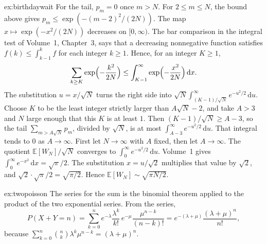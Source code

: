 \begin{solution}{ex:birthdaywait}
For the tail, $p_m=0$ once $m>N$. For $2\le m\le N$, the bound above gives $p_m\le\exp(-(m-2)^2/(2N))$. The map $x\mapsto\exp(-x^2/(2N))$ decreases on $[0,\infty)$. The bar comparison in the integral test of Volume~1, Chapter~3, says that a decreasing nonnegative function satisfies $f(k)\le\int_{k-1}^k f$ for each integer $k\ge1$. Hence, for an integer $K\ge1$,
\[
 \sum_{k\ge K}\exp\Bigl(-\frac{k^2}{2N}\Bigr)
 \le\int_{K-1}^\infty\exp\Bigl(-\frac{x^2}{2N}\Bigr)\,\mathrm dx.
\]
The substitution $u=x/\sqrt N$ turns the right side into $\sqrt N\int_{(K-1)/\sqrt N}^\infty e^{-u^2/2}\,\mathrm du$. Choose $K$ to be the least integer strictly larger than $A\sqrt N-2$, and take $A>3$ and $N$ large enough that this $K$ is at least $1$. Then $(K-1)/\sqrt N\ge A-3$, so the tail $\sum_{m>A\sqrt N}p_m$, divided by $\sqrt N$, is at most $\int_{A-3}^\infty e^{-u^2/2}\,\mathrm du$. That integral tends to $0$ as $A\to\infty$. First let $N\to\infty$ with $A$ fixed, then let $A\to\infty$. The quotient $\mathbb E[W_N]/\sqrt N$ converges to $\int_0^\infty e^{-u^2/2}\,\mathrm du$. Volume~1 gives $\int_0^\infty e^{-x^2}\,\mathrm dx=\sqrt\pi/2$. The substitution $x=u/\sqrt2$ multiplies that value by $\sqrt2$, and $\sqrt2\cdot\sqrt\pi/2=\sqrt{\pi/2}$. Hence $\mathbb E[W_N]\sim\sqrt{\pi N/2}$.
\end{solution}

\begin{solution}{ex:twopoisson}
\idea The series for the sum is the binomial theorem applied to the product of the two exponential series.
\writeup From the series,
\[
 P(X+Y=n)=\sum_{k=0}^n e^{-\lambda}\frac{\lambda^k}{k!}\,e^{-\mu}\frac{\mu^{n-k}}{(n-k)!}
 =e^{-(\lambda+\mu)}\frac{(\lambda+\mu)^n}{n!},
\]
because $\sum_{k=0}^n\binom{n}{k}\lambda^k\mu^{n-k}=(\lambda+\mu)^n$.
\end{solution}


